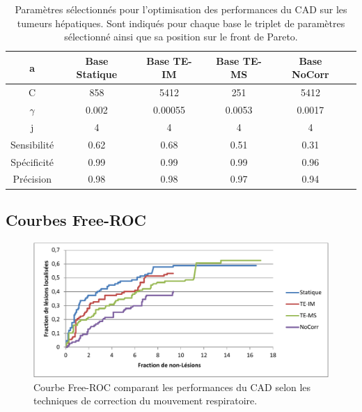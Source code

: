 \begin{table}[h!]
\begin{center}
		\begin{tabular}{c| c c c c c}
  \hline
  a	& Base Statique	& Base TE-IM	& Base TE-MS	& Base NoCorr	\\
  \hline
 C 	& 858		& 5412		& 251		& 5412		\\
\hline
$\gamma$& 0.002		& 0.00055	& 0.0053	& 0.0017	\\
\hline
j	& 4		& 4		& 4		& 4		\\
\hline
\hline
Sensibilité& 0.62	& 0.68		& 0.51		& 0.31	\\
\hline
Spécificité& 0.99	& 0.99		& 0.99		& 0.96		\\
\hline
Précision& 0.98		& 0.98		& 0.97		& 0.94		\\
\hline
 		\end{tabular}

\end{center}
\caption[Paramètres sélectionnés pour l'optimisation des performances du CAD sur les tumeurs hépatiques]{Paramètres sélectionnés pour l'optimisation des performances du CAD sur les tumeurs hépatiques. Sont indiqués pour chaque base le triplet de paramètres sélectionné ainsi que sa position sur le front de Pareto.}
\label{fig:paramsModFoie}
\end{table}

\subsection{Courbes Free-ROC}

\begin{figure}[h!]
 \begin{center}
   \includegraphics[width=15cm]{images/FROC_mod19}
   \vspace{-0.3cm}
 \end{center}
 \caption{Courbe Free-ROC comparant les performances du CAD selon les techniques de correction du mouvement respiratoire.}
\label{fig:froc_mod19}
\end{figure}


